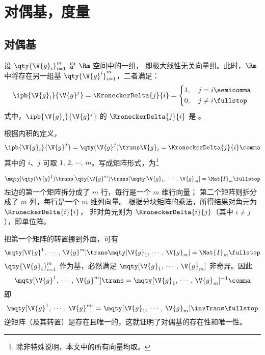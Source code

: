\section{对偶基，度量}
\subsection{对偶基} \label{subsec:对偶基}
设 $\qty{\V{g}_i}^m_{i=1}$ 是 $\Rm$ 空间中的一组，
即极大线性无关向量组。此时，$\Rm$ 中将存在另一组基
$\qty{\V{g}^i}^m_{i=1}$，二者满足：
\begin{equation}
	\ipb{\V{g}_i}{\V{g}^j}=\KroneckerDelta{j}{i}
	=\left\{\begin{aligned}
		1,\quad j&=i \semicomma\\
		0,\quad j&\neq i \fullstop
	\end{aligned}\right.
	\label{eq:对偶关系}
\end{equation}
式中，$\ipb{\V{g}_i}{\V{g}^j}$ 的 $\KroneckerDelta{j}{i}$ 是 
。

\begin{myProof}
根据内积的定义，
\begin{equation}
	\ipb{\V{g}_i}{\V{g}^j}=\qty(\V{g}^j)\trans\V{g}_i
	=\KroneckerDelta{j}{i} \comma
\end{equation}
其中的 $i$、$j$ 可取 $1,\,2,\,\cdots,\,m$。写成矩阵形式，为\footnote{
	除非特殊说明，本文中的所有向量均取。}
\begin{equation}
	\mqty[\qty(\V{g}^1)\trans \\ \vdots \\ \qty(\V{g}^m)\trans]
	\mqty[\V{g}_1,\,\cdots,\,\V{g}_m] = \Mat{I}_m \fullstop
\end{equation}
左边的第一个矩阵拆分成了 $m$ 行，每行是一个 $m$ 维行向量；
第二个矩阵则拆分成了 $m$ 列，每行是一个 $m$ 维列向量。
根据分块矩阵的乘法，所得结果对角元为 $\KroneckerDelta{i}{i}$，
非对角元则为 $\KroneckerDelta{i}{j}$（其中 $i\neq j$），即单位阵。

把第一个矩阵的转置挪到外面，可有
\begin{equation}
	\mqty[\V{g}^1,\,\cdots,\,\V{g}^m]\trans
	\mqty[\V{g}_1,\,\cdots,\,\V{g}_m] = \Mat{I}_m \fullstop
\end{equation}
$\qty{\V{g}_i}^m_{i=1}$ 作为基，必然满足
$\mqty[\V{g}_1,\,\cdots,\,\V{g}_m]$ 非奇异。因此
\begin{equation}
	\mqty[\V{g}^1,\,\cdots,\,\V{g}^m]\trans
	=\mqty[\V{g}_1,\,\cdots,\,\V{g}_m]^{-1} \comma
\end{equation}
即
\begin{equation}
	\mqty[\V{g}^1,\,\cdots,\,\V{g}^m]
	=\mqty[\V{g}_1,\,\cdots,\,\V{g}_m]\invTrans \fullstop
	\label{eq:逆变基用协变基表示}
\end{equation}
逆矩阵（及其转置）是存在且唯一的，这就证明了对偶基的存在性和唯一性。
\end{myProof}

